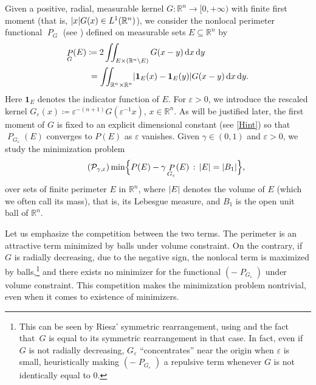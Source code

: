 \documentclass[JEP,XML,SOM,Unicode,published]{cedram}
\newcommand{\sep}{\,:\,}
\newcommand{\enquote}[1]{``#1''}
\numberwithin{equation}{section}
\theoremstyle{plain}
\theoremstyle{definition}
\newcommand{\numberset}[1]{{\mathbb{#1}}}
\newcommand{\R}{\numberset{R}}
\newcommand{\dx}{\mathop{}\mathopen{}\mathrm{d}x}
\newcommand{\dy}{\mathop{}\mathopen{}\mathrm{d}y}
\let\eps\varepsilon
\newcommand{\ind}{{\mathbf{1}}}
\newcommand{\Ren}{{\R^n}}
\newcommand{\subsq}{\subseteq}
\DeclareMathOperator{\Per}{\mathit{P}}
\DeclarePairedDelimiter{\abs}{\lvert}{\rvert}
\begin{document}
Given a positive, radial, measurable kernel $G:\Ren\to [0,+\infty)$ with finite first moment (that
is, $\abs{x}G(x)\in L^1(\Ren)$), we consider the nonlocal perimeter functional $\Per_G$
(see \eg \cite{CN2018,BP2019}) defined on measurable sets $E\subsq\Ren$ by
\begin{equation}\label{eq:defPG}
\begin{split}
\Per_G(E)&\coloneqq 2\iint_{E \times \left(\Ren\setminus E\right)} G(x-y) \dx\dy\\
&\hphantom{:}=\iint_{\Ren\times\Ren} \abs{\ind_E(x)-\ind_E(y)}G(x-y)\dx\dy.
\end{split}
\end{equation}
Here $\ind_E$ denotes the indicator function of $E$.
For $\eps>0$, we introduce the rescaled kernel $G_\eps(x)\coloneqq\eps^{-(n+1)}G(\eps^{-1}x)$,
$x\in\Ren$. As will be justified later, the first moment of $G$ is fixed to an explicit dimensional
constant (see \cref{Hint}) so that $\Per_{G_\eps}(E)$ converges to $P(E)$ as $\eps$ vanishes. Given
$\gamma\in (0,1)$ and $\eps>0$, we study the minimization problem
\begin{equation}\label{minrp}\tag{$\mathcal{P}_{\gamma,\eps}$}
\min \Bigl\{ P(E)-\gamma\Per_{G_\eps}(E)\sep \abs{E}=\abs{B_1}\Bigr\},
\end{equation}
over sets of finite perimeter $E$ in $\Ren$, where $\abs{E}$ denotes the volume of $E$ (which we
often call its mass), that is, its Lebesgue measure, and $B_1$ is the open unit ball of $\Ren$.

Let us emphasize the competition between the two terms. The perimeter is an attractive term
minimized by balls under volume constraint. On the contrary, if $G$ is radially decreasing, due to
the negative sign, the nonlocal term is maximized by balls,\footnote{This can be seen by Riesz'
symmetric rearrangement, using \eg \cite[Chap.\,3.7]{LL2001} and the fact that~$G$ is equal to
its symmetric rearrangement in that case. In fact, even if $G$ is not radially decrea\-sing,
$G_\eps$ \enquote{concentrates} near the origin when $\eps$ is small, heuristically making
$(-\Per_{G_\eps})$ a repulsive term whenever $G$ is not identically equal to $0$.} and there
exists no minimizer for the functional $(-\Per_{G_\eps})$ under volume constraint. This competition
makes the minimization problem nontrivial, even when it comes to existence of minimizers.
\end{document}
